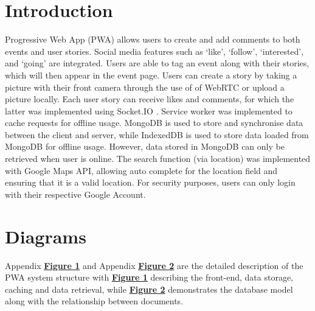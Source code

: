 \documentclass[11pt, a4paper]{article}
\begin{document}
\section{Introduction}
Progressive Web App (PWA) allows users to create and add comments to both events and user stories.
Social media features such as `like', `follow', `interested', and `going' are integrated. Users are
able to tag an event along with their stories, which will then appear in the event page. Users can
create a story by taking a picture with their front camera through the use of
of WebRTC or upload a picture locally. Each user story can receive likes and comments, for which
the latter was implemented using Socket.IO \cite{week6, socketio}. Service worker was implemented
to cache requests for offline usage. MongoDB is used to store and synchronise data between the
client and server, while IndexedDB is used to store data loaded from MongoDB for offline usage.
However, data stored in MongoDB can only be retrieved when user is online. The search function (via
location) was implemented with Google Maps API, allowing auto complete for the location field and
ensuring that it is a valid location. For security purposes, users can only login with their
respective Google Account.

\section{Diagrams}
Appendix \hyperref[figure:site_map]{\textbf{Figure 1}} and Appendix \hyperref[figure:uml]{
\textbf{Figure 2}} are the detailed description of the PWA system structure with
\hyperref[figure:site_map]{\textbf{Figure 1}} describing the front-end, data storage, caching and
data retrieval, while \hyperref[figure:uml]{\textbf{Figure 2}} demonstrates the database model along
with the relationship between documents.
\end{document}
